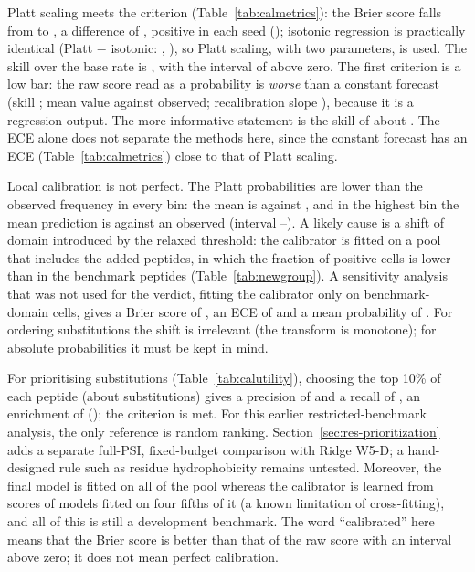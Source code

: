 Platt scaling meets the criterion (Table~\ref{tab:calmetrics}): the Brier score falls from \nCalBrierRaw{} to \nCalBrierPlatt{},
a difference of \nCalDelta{} \nCalDeltaCI{}, positive in each seed (\nCalSeeds{}); isotonic regression is practically identical
(Platt $-$ isotonic: \nCalPlattIso{}, \nCalPlattIsoCI{}), so Platt scaling, with two parameters, is used. The skill over the base rate is
\nCalSkillPlatt{}, with the interval of \nCalConstDelta{} \nCalConstCI{} above zero. The first criterion is a low bar: the raw score read as a
probability is \emph{worse} than a constant forecast (skill \nCalSkillRaw{}; mean value \nCalMeanRaw{} against \nCalObs{} observed; recalibration
slope \nCalRawSlope{}), because it is a regression output. The more informative statement is the skill of about \nCalSkillPlatt{}.
The ECE alone does not separate the methods here, since the constant forecast has an ECE (Table~\ref{tab:calmetrics}) close to that of Platt scaling.

Local calibration is not perfect. The Platt probabilities are lower than the observed frequency in every bin: the mean is \nCalMeanPlatt{}
against \nCalObs{}, and in the highest bin the mean prediction is \nCalTopPred{} against an observed \nCalTopObs{} (interval \nCalTopObsLo{}--\nCalTopObsHi{}). A likely
cause is a shift of domain introduced by the relaxed threshold: the calibrator is fitted on a pool that includes the added peptides, in which the fraction of positive cells is lower than
in the benchmark peptides (Table~\ref{tab:newgroup}). A sensitivity analysis that was not used for the verdict, fitting the calibrator only on benchmark-domain cells, gives a
Brier score of \nCalDomBrier{}, an ECE of \nCalDomEce{} and a mean probability of \nCalDomMean{}. For ordering substitutions the shift is irrelevant (the transform is monotone); for absolute
probabilities it must be kept in mind.

\begin{table}[htbp]
  \centering
  \caption[Ranking utility]{Ranking utility: the substitutions of each peptide (532 per 28-residue peptide) are ordered by the raw score. A random ranking has
  enrichment 1.}\label{tab:calutility}
  
\end{table}

For prioritising substitutions (Table~\ref{tab:calutility}), choosing the top 10\% of each peptide (about \nKTen{} substitutions) gives a precision of \nPrecTen{} and
a recall of \nRecTen{}, an enrichment of \nEnrTen{} (\nEnrTenCI{}); the criterion is met.
For this earlier restricted-benchmark analysis, the only reference is random ranking.
Section~\ref{sec:res-prioritization} adds a separate full-PSI, fixed-budget comparison with Ridge W5-D;
a hand-designed rule such as residue hydrophobicity remains untested. Moreover, the final model is fitted on
all of the pool whereas the calibrator is learned from scores of models fitted on four fifths of it (a known limitation of cross-fitting), and all of this is
still a development benchmark. The word ``calibrated'' here means that the Brier score is better than that of the raw score with an interval above zero; it does
not mean perfect calibration.

